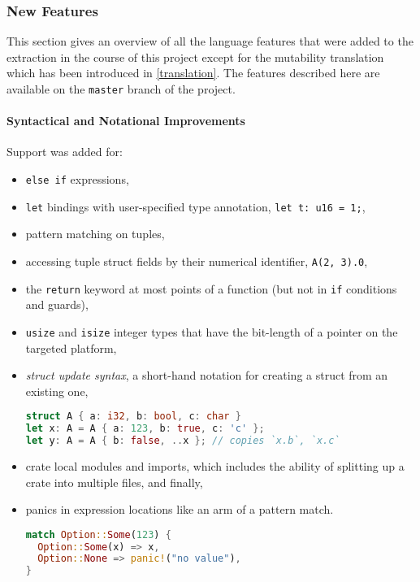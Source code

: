 \subsubsection{New Features}

This section gives an overview of all the language features that were added to
the extraction in the course of this project except for the mutability
translation which has been introduced in \autoref{translation}. The features
described here are available on the \lstinline!master! branch of the project.

\paragraph{Syntactical and Notational Improvements}

Support was added for:

\begin{itemize}
\item
  \passthrough{\lstinline!else if!} expressions,
\item
  \passthrough{\lstinline!let!} bindings with user-specified type
  annotation, \passthrough{\lstinline!let t: u16 = 1;!},
\item
  pattern matching on tuples,
\item
  accessing tuple struct fields by their numerical identifier,
  \passthrough{\lstinline!A(2, 3).0!},
\item
  the \passthrough{\lstinline!return!} keyword at most points
  of a function (but not in \lstinline!if! conditions and guards),
\item
  \passthrough{\lstinline!usize!} and \passthrough{\lstinline!isize!}
  integer types that have the bit-length of a pointer on the targeted
  platform,
\item
  \emph{struct update syntax}, a short-hand notation for creating a
  struct from an existing one,
\begin{lstlisting}[language=Rust]
struct A { a: i32, b: bool, c: char }
let x: A = A { a: 123, b: true, c: 'c' };
let y: A = A { b: false, ..x }; // copies `x.b`, `x.c`
\end{lstlisting}

\item
  crate local modules and imports, which includes the ability of
  splitting up a crate into multiple files, and finally,
\item
  panics in expression locations like an arm of a pattern match.
\begin{lstlisting}[language=Rust]
match Option::Some(123) {
  Option::Some(x) => x,
  Option::None => panic!("no value"),
}
\end{lstlisting}

\end{itemize}

